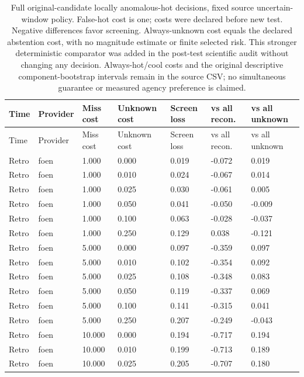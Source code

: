 {\tabletext
\setlength{\tabcolsep}{3pt}
\begin{longtable}{p{}p{}p{}p{}p{}p{}p{}}
\caption{Full original-candidate locally anomalous-hot decisions, fixed source uncertain-window policy. False-hot cost is one; costs were declared before new test. Negative differences favor screening. Always-unknown cost equals the declared abstention cost, with no magnitude estimate or finite selected risk. This stronger deterministic comparator was added in the post-test scientific audit without changing any decision. Always-hot/cool costs and the original descriptive component-bootstrap intervals remain in the source CSV; no simultaneous guarantee or measured agency preference is claimed.}\label{tab:r3si-decision_costs}\\
\toprule
Time & Provider & Miss cost & Unknown cost & Screen loss & vs all recon. & vs all unknown \\
\midrule
\endfirsthead
\toprule
Time & Provider & Miss cost & Unknown cost & Screen loss & vs all recon. & vs all unknown \\
\midrule
\endhead
Retro & foen & 1.000 & 0.000 & 0.019 & -0.072 & 0.019 \\
Retro & foen & 1.000 & 0.010 & 0.024 & -0.067 & 0.014 \\
Retro & foen & 1.000 & 0.025 & 0.030 & -0.061 & 0.005 \\
Retro & foen & 1.000 & 0.050 & 0.041 & -0.050 & -0.009 \\
Retro & foen & 1.000 & 0.100 & 0.063 & -0.028 & -0.037 \\
Retro & foen & 1.000 & 0.250 & 0.129 & 0.038 & -0.121 \\
Retro & foen & 5.000 & 0.000 & 0.097 & -0.359 & 0.097 \\
Retro & foen & 5.000 & 0.010 & 0.102 & -0.354 & 0.092 \\
Retro & foen & 5.000 & 0.025 & 0.108 & -0.348 & 0.083 \\
Retro & foen & 5.000 & 0.050 & 0.119 & -0.337 & 0.069 \\
Retro & foen & 5.000 & 0.100 & 0.141 & -0.315 & 0.041 \\
Retro & foen & 5.000 & 0.250 & 0.207 & -0.249 & -0.043 \\
Retro & foen & 10.000 & 0.000 & 0.194 & -0.717 & 0.194 \\
Retro & foen & 10.000 & 0.010 & 0.199 & -0.713 & 0.189 \\
Retro & foen & 10.000 & 0.025 & 0.205 & -0.707 & 0.180 \\

\end{longtable}}
